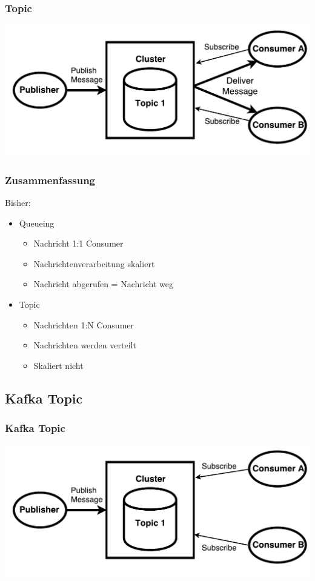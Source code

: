 \begin{frame}
\frametitle{Topic}
	\centering
	\includegraphics[scale=0.6]{figure/topic_draw.pdf}
	
\end{frame}

\begin{frame}
\frametitle{Zusammenfassung}

Bisher: 
\begin{itemize}
	\item Queueing
	\begin{itemize}
		\item Nachricht 1:1 Consumer
		\item Nachrichtenverarbeitung skaliert
		\item Nachricht abgerufen = Nachricht weg
	\end{itemize}
	\item Topic
	\begin{itemize}
		\item Nachrichten 1:N Consumer
		\item Nachrichten werden verteilt
		\item Skaliert nicht  			%
	\end{itemize}
\end{itemize}
\end{frame}

\subsection{Kafka Topic}
\begin{frame}
\frametitle{Kafka Topic}
\centering
\includegraphics[scale=0.6]{figure/Kafka_topic_draw_subscribe.pdf}
\end{frame}

